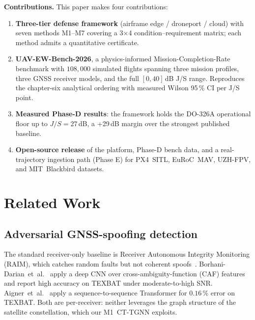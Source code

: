 \documentclass[10pt,journal,compsoc,twoside]{IEEEtran}
\begin{document}
\noindent\textbf{Contributions.} This paper makes four contributions:

\begin{enumerate}
\item \textbf{Three-tier defense framework} (airframe edge / droneport /
cloud) with seven methods M1--M7 covering a 3$\times$4
condition--requirement matrix; each method admits a quantitative
certificate.

\item \textbf{UAV-EW-Bench-2026}, a physics-informed Mission-Completion-Rate
benchmark with $108{,}000$ simulated flights spanning three mission
profiles, three GNSS receiver models, and the full $[0,40]$\,dB J/S
range. Reproduces the chapter-six analytical ordering with measured
Wilson 95\,\% CI per J/S point.

\item \textbf{Measured Phase-D results}: the framework holds the
DO-326A operational floor up to $J/S{=}27$\,dB, a +29\,dB margin
over the strongest published baseline.

\item \textbf{Open-source release} of the platform, Phase-D bench data,
and a real-trajectory ingestion path (Phase E) for PX4~SITL,
EuRoC~MAV, UZH-FPV, and MIT~Blackbird datasets.
\end{enumerate}

\section{Related Work}
\label{sec:related}

\subsection{Adversarial GNSS-spoofing detection}
The standard receiver-only baseline is Receiver Autonomous Integrity
Monitoring (RAIM), which catches random faults but not coherent
spoofs~\cite{CRPA_GPSWorld2020}. Borhani-Darian~et~al.~\cite{BorhaniDarian2024CAF}
apply a deep CNN over cross-ambiguity-function (CAF) features and
report high accuracy on TEXBAT under moderate-to-high SNR.
Aigner~et~al.~\cite{Aigner2025Seq2Seq} apply a sequence-to-sequence
Transformer for $0.16$\,\% error on TEXBAT. Both are per-receiver:
neither leverages the graph structure of the satellite constellation,
which our M1~CT-TGNN exploits.
\end{document}
